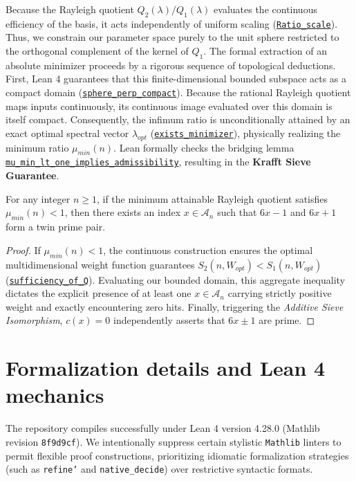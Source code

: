 \documentclass[lean]{AFM}
\renewcommand{\.}{\hskip .75pt}
\def\urlpfx{https://github.com/ElNando888/KrafftSieve/blob/v1.0}
\begin{document}
Because the Rayleigh quotient $Q_2(\lambda) / Q_1(\lambda)$ evaluates the continuous efficiency
of the basis, it acts independently of uniform scaling
(\href{\urlpfx/KrafftSieve/OptimalWeights.lean#L374}{\texttt{Ratio\_scale}}). Thus, we constrain
our parameter space purely to the unit sphere restricted to the orthogonal complement of the kernel
of $Q_1$. The formal extraction of an absolute minimizer proceeds by a rigorous sequence of
topological deductions. First, Lean 4 guarantees that this finite-dimensional bounded subspace acts
as a compact domain (\href{\urlpfx/KrafftSieve/OptimalWeights.lean#L459}
{\texttt{sphere\_perp\_compact}}). Because the rational Rayleigh quotient maps inputs continuously,
its continuous image evaluated over this domain is itself compact. Consequently, the infimum ratio
is unconditionally attained by an exact optimal spectral vector $\lambda_{opt}$
(\href{\urlpfx/KrafftSieve/OptimalWeights.lean#L628}{\texttt{exists\_minimizer}}), physically
realizing the minimum ratio $\mu_{min}(n)$. Lean formally
checks the bridging lemma \href{\urlpfx/KrafftSieve/OptimalWeights.lean#L188}
{\texttt{mu\_min\_lt\_one\_implies\_admissibility}}, resulting in
the \textbf{Krafft Sieve Guarantee}.

\begin{theorem}
For any integer $n \ge 1$, if the minimum attainable Rayleigh quotient satisfies $\mu_{min}(n) < 1$,
then there exists an index $x \in \mathcal{A}_n$ such that $6x-1$ and $6x+1$ form a twin prime pair.
\end{theorem}
\begin{proof}
If $\mu_{min}(n) < 1$, the continuous construction ensures the optimal multidimensional weight
function guarantees $S_2(n, W_{opt}) < S_1(n, W_{opt})$
(\href{\urlpfx/KrafftSieve/OptimalWeights.lean#L166}{\texttt{sufficiency\_of\_Q}}).
Evaluating our bounded domain, this aggregate inequality dictates the explicit presence of at least
one $x \in \mathcal{A}_n$ carrying strictly positive weight and exactly encountering zero hits.
Finally, triggering the \textit{Additive Sieve Isomorphism}, $c(x) = 0$ independently asserts
that $6x \pm 1$ are prime.
\end{proof}

\section{Formalization details and Lean 4 mechanics} \label{formalization}

The repository compiles successfully under Lean 4 version 4.28.0 (Mathlib revision \texttt{8f9d9cf}).
We intentionally suppress certain stylistic \texttt{Mathlib} linters to permit flexible proof
constructions, prioritizing idiomatic formalization strategies (such as \texttt{refine'} and
\texttt{native\_decide}) over restrictive syntactic formats.
\end{document}

